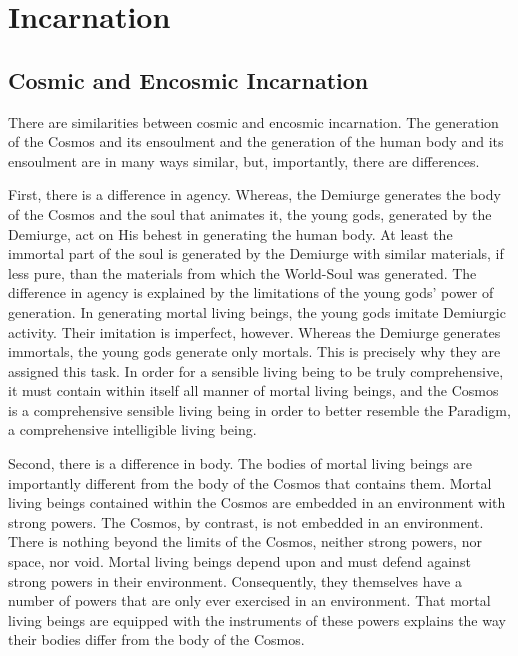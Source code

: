 \chapter{Incarnation} %
\label{cha:incarnation}

\section{Cosmic and Encosmic Incarnation} %
\label{sec:cosmic_and_encosmic_incarnation}

There are similarities between cosmic and encosmic incarnation. The generation of the Cosmos and its ensoulment and the generation of the human body and its ensoulment are in many ways similar, but, importantly, there are differences. 

First, there is a difference in agency. Whereas, the Demiurge generates the body of the Cosmos and the soul that animates it, the young gods, generated by the Demiurge, act on His behest in generating the human body. At least the immortal part of the soul is generated by the Demiurge with similar materials, if less pure, than the materials from which the World-Soul was generated. The difference in agency is explained by the limitations of the young gods' power of generation. In generating mortal living beings, the young gods imitate Demiurgic activity. Their imitation is imperfect, however. Whereas the Demiurge generates immortals, the young gods generate only mortals. This is precisely why they are assigned this task. In order for a sensible living being to be truly comprehensive, it must contain within itself all manner of mortal living beings, and the Cosmos is a comprehensive sensible living being in order to better resemble the Paradigm, a comprehensive intelligible living being. 

Second, there is a difference in body. The bodies of mortal living beings are importantly different from the body of the Cosmos that contains them. Mortal living beings contained within the Cosmos are embedded in an environment with strong powers. The Cosmos, by contrast, is not embedded in an environment. There is nothing beyond the limits of the Cosmos, neither strong powers, nor space, nor void. Mortal living beings depend upon and must defend against strong powers in their environment. Consequently, they themselves have a number of powers that are only ever exercised in an environment. That mortal living beings are equipped with the instruments of these powers explains the way their bodies differ from the body of the Cosmos.

